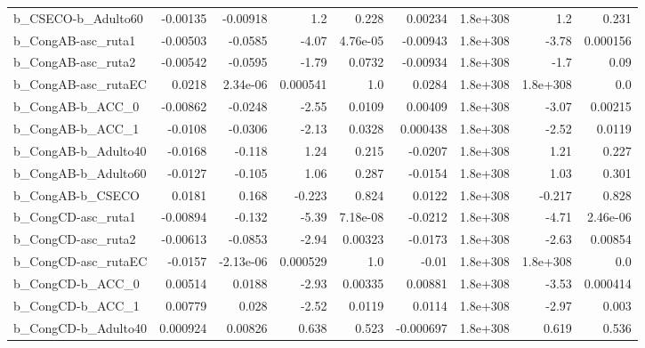 \begin{tabular}{lrrrrrrrr}
b\_CSECO-b\_Adulto60           &    -0.00135 &     -0.00918 &       1.2 &    0.228 &    0.00234 &    1.8e+308 &          1.2 &         0.231 \\
b\_CongAB-asc\_ruta1           &    -0.00503 &      -0.0585 &     -4.07 & 4.76e-05 &   -0.00943 &    1.8e+308 &        -3.78 &      0.000156 \\
b\_CongAB-asc\_ruta2           &    -0.00542 &      -0.0595 &     -1.79 &   0.0732 &   -0.00934 &    1.8e+308 &         -1.7 &          0.09 \\
b\_CongAB-asc\_rutaEC          &      0.0218 &     2.34e-06 &  0.000541 &      1.0 &     0.0284 &    1.8e+308 &     1.8e+308 &           0.0 \\
b\_CongAB-b\_ACC\_0             &    -0.00862 &      -0.0248 &     -2.55 &   0.0109 &    0.00409 &    1.8e+308 &        -3.07 &       0.00215 \\
b\_CongAB-b\_ACC\_1             &     -0.0108 &      -0.0306 &     -2.13 &   0.0328 &   0.000438 &    1.8e+308 &        -2.52 &        0.0119 \\
b\_CongAB-b\_Adulto40          &     -0.0168 &       -0.118 &      1.24 &    0.215 &    -0.0207 &    1.8e+308 &         1.21 &         0.227 \\
b\_CongAB-b\_Adulto60          &     -0.0127 &       -0.105 &      1.06 &    0.287 &    -0.0154 &    1.8e+308 &         1.03 &         0.301 \\
b\_CongAB-b\_CSECO             &      0.0181 &        0.168 &    -0.223 &    0.824 &     0.0122 &    1.8e+308 &       -0.217 &         0.828 \\
b\_CongCD-asc\_ruta1           &    -0.00894 &       -0.132 &     -5.39 & 7.18e-08 &    -0.0212 &    1.8e+308 &        -4.71 &      2.46e-06 \\
b\_CongCD-asc\_ruta2           &    -0.00613 &      -0.0853 &     -2.94 &  0.00323 &    -0.0173 &    1.8e+308 &        -2.63 &       0.00854 \\
b\_CongCD-asc\_rutaEC          &     -0.0157 &    -2.13e-06 &  0.000529 &      1.0 &      -0.01 &    1.8e+308 &     1.8e+308 &           0.0 \\
b\_CongCD-b\_ACC\_0             &     0.00514 &       0.0188 &     -2.93 &  0.00335 &    0.00881 &    1.8e+308 &        -3.53 &      0.000414 \\
b\_CongCD-b\_ACC\_1             &     0.00779 &        0.028 &     -2.52 &   0.0119 &     0.0114 &    1.8e+308 &        -2.97 &         0.003 \\
b\_CongCD-b\_Adulto40          &    0.000924 &      0.00826 &     0.638 &    0.523 &  -0.000697 &    1.8e+308 &        0.619 &         0.536 \\

\end{tabular}
